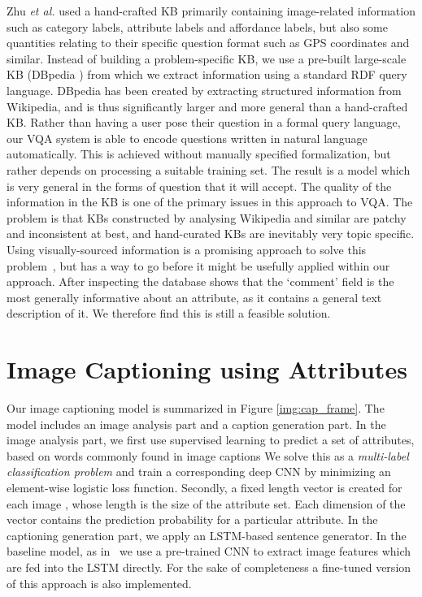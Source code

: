\documentclass[10pt,journal,compsoc]{IEEEtran}
\newcommand{\etal}{\emph{et al.}}
\begin{document}
Zhu \etal \cite{zhu2015building} used a hand-crafted KB primarily containing image-related information such as category labels, attribute labels and affordance labels, but also some quantities relating to their specific question format such as GPS coordinates and similar. Instead of building a problem-specific KB, we use a pre-built large-scale KB (DBpedia \cite{auer2007dbpedia}) from which we extract information using a standard RDF query language. DBpedia has been created by extracting structured information from Wikipedia, and is thus significantly larger and more general than a hand-crafted KB. Rather than having a user pose their question in a formal query language, our VQA system is able to encode questions written in natural language automatically.  This is achieved without manually specified formalization, but rather depends on processing a suitable training set. The result is a model which is very general in the forms of question that it will accept.
The quality of the information in the KB is one of the primary issues in this approach to VQA. The problem is that KBs constructed by analysing Wikipedia and similar are patchy and inconsistent at best, and hand-curated KBs are inevitably very topic specific. Using visually-sourced information is a promising approach to solve this problem~\cite{Lin_2015_CVPR, Sadeghi_2015_CVPR}, but has a way to go before it might be usefully applied within our approach. After inspecting the database shows that the ‘comment’ field is the most generally informative about an attribute, as it contains a general text description of it. We therefore find this is still a feasible solution. 
 
\section{Image Captioning using Attributes}
\label{sec:image_captioning}
Our image captioning model is summarized in Figure \ref{img:cap_frame}. The model includes an image analysis part and a caption generation part. In the image analysis part, we first use supervised learning to predict a set of attributes, based on words commonly found in image captions We solve this as a \textit{multi-label classification problem} and train a corresponding deep CNN by minimizing an element-wise logistic loss function. Secondly, a fixed length vector  is created for each image , whose length is the size of the attribute set. Each dimension of the vector contains the prediction probability for a particular attribute. In the captioning generation part, we apply an LSTM-based sentence generator. In the baseline model, as in~\cite{gao2015you,ren2015image,vinyals2014show} we use a pre-trained CNN to extract image features  which are fed into the LSTM directly. For the sake of completeness a fine-tuned version of this approach is also implemented.
\end{document}
